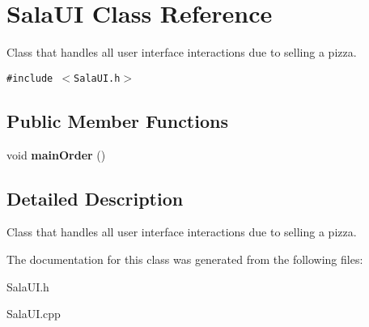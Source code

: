 \hypertarget{class_sala_u_i}{
\section{Sala\-UI Class Reference}
\label{class_sala_u_i}
}
Class that handles all user interface interactions due to selling a pizza.  


{\tt \#include $<$Sala\-UI.h$>$}

\subsection*{Public Member Functions}
\begin{CompactItemize}
\item 
\hypertarget{class_sala_u_i_d30e21f7319d652c2a2fd88dc274cfbc}{
void {\bf main\-Order} ()}
\label{class_sala_u_i_d30e21f7319d652c2a2fd88dc274cfbc}

\end{CompactItemize}


\subsection{Detailed Description}
Class that handles all user interface interactions due to selling a pizza. 



The documentation for this class was generated from the following files:\begin{CompactItemize}
\item 
Sala\-UI.h\item 
Sala\-UI.cpp\end{CompactItemize}
